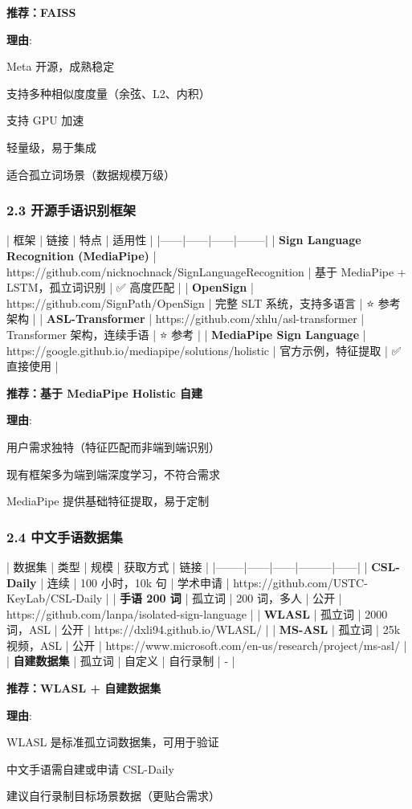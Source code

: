 \documentclass[a4paper,12pt]{article}
\begin{document}
\textbf{推荐：FAISS}

\textbf{理由}:
\item Meta 开源，成熟稳定
\item 支持多种相似度度量（余弦、L2、内积）
\item 支持 GPU 加速
\item 轻量级，易于集成
\item 适合孤立词场景（数据规模万级）

\subsubsection{2.3 开源手语识别框架}

| 框架 | 链接 | 特点 | 适用性 |
|------|------|------|--------|
| \textbf{Sign Language Recognition (MediaPipe)} | https://github.com/nicknochnack/SignLanguageRecognition | 基于 MediaPipe + LSTM，孤立词识别 | ✅ 高度匹配 |
| \textbf{OpenSign} | https://github.com/SignPath/OpenSign | 完整 SLT 系统，支持多语言 | ⭐ 参考架构 |
| \textbf{ASL-Transformer} | https://github.com/xhlu/asl-transformer | Transformer 架构，连续手语 | ⭐ 参考 |
| \textbf{MediaPipe Sign Language} | https://google.github.io/mediapipe/solutions/holistic | 官方示例，特征提取 | ✅ 直接使用 |

\textbf{推荐：基于 MediaPipe Holistic 自建}

\textbf{理由}:
\item 用户需求独特（特征匹配而非端到端识别）
\item 现有框架多为端到端深度学习，不符合需求
\item MediaPipe 提供基础特征提取，易于定制

\subsubsection{2.4 中文手语数据集}

| 数据集 | 类型 | 规模 | 获取方式 | 链接 |
|--------|------|------|---------|------|
| \textbf{CSL-Daily} | 连续 | 100 小时，10k 句 | 学术申请 | https://github.com/USTC-KeyLab/CSL-Daily |
| \textbf{手语 200 词} | 孤立词 | 200 词，多人 | 公开 | https://github.com/lanpa/isolated-sign-language |
| \textbf{WLASL} | 孤立词 | 2000 词，ASL | 公开 | https://dxli94.github.io/WLASL/ |
| \textbf{MS-ASL} | 孤立词 | 25k 视频，ASL | 公开 | https://www.microsoft.com/en-us/research/project/ms-asl/ |
| \textbf{自建数据集} | 孤立词 | 自定义 | 自行录制 | - |

\textbf{推荐：WLASL + 自建数据集}

\textbf{理由}:
\item WLASL 是标准孤立词数据集，可用于验证
\item 中文手语需自建或申请 CSL-Daily
\item 建议自行录制目标场景数据（更贴合需求）
\end{document}
